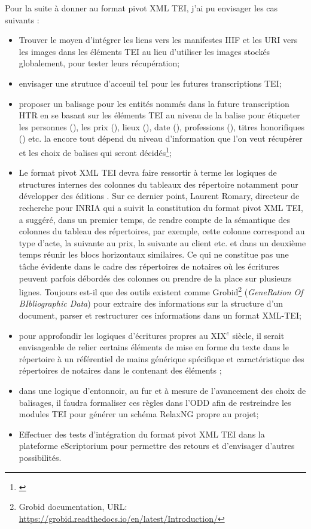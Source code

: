 Pour la suite à donner au format pivot XML TEI, j'ai pu envisager les cas suivants :
\begin{itemize}
    \item Trouver le moyen d'intégrer les liens vers les manifestes IIIF et les URI vers les images dans les éléments TEI  au lieu d'utiliser les images stockés globalement, pour tester leurs récupération;
    \item envisager une strutuce d'acceuil teI pour les futures transcriptions TEI;
    \item proposer un balisage pour les entités nommés dans la future transcription HTR en se basant sur les éléments TEI au niveau de la balise  pour étiqueter les personnes (), les prix (), lieux (), date (), professions (), titres honorifiques () etc. la encore tout dépend du niveau d'information que l'on veut récupérer et les choix de balises qui seront décidés\footnote{\cite{le_pevedic_retour_2016}};
    \item Le format pivot XML TEI devra faire ressortir à terme les logiques de structures internes des colonnes du tableaux des répertoire notamment pour développer des éditions . Sur ce dernier point, Laurent Romary, directeur de recherche pour INRIA qui a suivit la constitution du format pivot XML TEI, a suggéré, dans un premier temps, de rendre compte de la sémantique des colonnes du tableau des répertoires, par exemple, cette colonne correspond au type d'acte, la suivante au prix, la suivante au client etc. et dans un deuxième temps réunir les blocs horizontaux similaires. Ce qui ne constitue pas une tâche évidente dans le cadre des répertoires de notaires où les écritures peuvent parfois débordés des colonnes ou prendre de la place sur plusieurs lignes. Toujours est-il que des outils existent comme Grobid\footnote{Grobid documentation, URL: \url{https://grobid.readthedocs.io/en/latest/Introduction/}} (\textit{GeneRation Of BIbliographic Data}) pour extraire des informations sur la structure d'un document, parser et restructurer ces informations dans un format XML-TEI;
    \item pour approfondir les logiques d'écritures propres au XIX$^e$ siècle, il serait envisageable de relier certains éléments de mise en forme du texte dans le répertoire à un référentiel de mains générique spécifique et caractéristique des répertoires de notaires dans le  contenant des éléments ;
    \item dans une logique d'entonnoir, au fur et à mesure de l'avancement des choix de balisages, il faudra formaliser ces règles dans l'ODD afin de restreindre les modules TEI pour générer un schéma RelaxNG propre au projet;
    \item Effectuer des tests d'intégration du format pivot XML TEI dans la plateforme eScriptorium pour permettre des retours et d'envisager d'autres possibilités. 
\end{itemize}
\newpage

